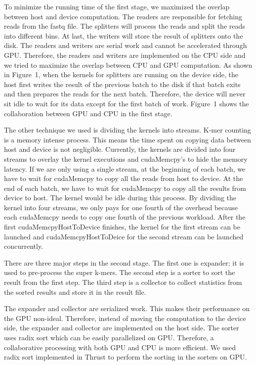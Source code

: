 \documentclass{bioinfo}
\begin{document}
\begin{methods}
To minimize the running time of the first stage, we maximized the overlap between host and
device computation.
The readers are responsible for fetching reads from the fastq file.
The splitters will process the reads and split the reads into different bins.
At last, the writers will store the result of splitters onto the disk.
The readers and writers are serial work and cannot be accelerated through GPU.
Therefore, the readers and writers are implemented on the CPU side and we tried to 
maximize the overlap between CPU and GPU computation.
As shown in Figure~1\vphantom{\ref{fig:01}}, when the kernels for splitters are running on
the device side, the host first writes the result of the previous batch to the disk if
that batch exits and then prepares the reads for the next batch.
Therefore, the device will never sit idle to wait for its data except for the first batch
of work. Figure~1\vphantom{\ref{fig:01}} shows the collaboration between GPU and CPU in
the first stage.

The other technique we used is dividing the kernels into streams.
K-mer counting is a memory intense process. This means the time spent on copying data
between host and device is not negligible.
Currently, the kernels are divided into four streams to overlay the kernel executions and
cudaMemcpy's to hide the memory latency.
If we are only using a single stream, at the beginning of each batch, we have to wait for
cudaMemcpy to copy all the reads from host to device.
At the end of each batch, we have to wait for cudaMemcpy to copy all the results from
device to host.
The kernel would be idle during this process.
By dividing the kernel into four streams, we only pays for one fourth of the overhead
because each cudaMemcpy needs to copy one fourth of the previous workload.
After the first cudaMemcpyHostToDevice finishes, the kernel for the first stream can be
launched and cudaMemcpyHostToDeice for the second stream can be launched concurrently.

There are three major steps in the second stage.
The first one is expander; it is used to pre-process the super k-mers. The second step is
a sorter to sort the result from the first step. The third step is a collector to collect
statistics from the sorted results and store it in the result file.

The expander and collector are serialized work. This makes their performance on the GPU
non-ideal.
Therefore, instead of moving the computation to the device side, the expander and
collector are implemented on the host side.
The sorter uses radix sort which can be easily parallelized on GPU.
Therefore, a collaborative processing with both GPU and CPU is more efficient.
We used radix sort implemented in Thrust to perform the sorting in the sorters on GPU.


\end{methods}
\end{document}

